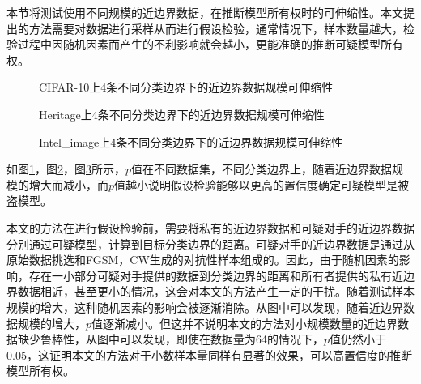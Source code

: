 本节将测试使用不同规模的近边界数据，在推断模型所有权时的可伸缩性。本文提出的方法需要对数据进行采样从而进行假设检验，通常情况下，样本数量越大，检验过程中因随机因素而产生的不利影响就会越小，更能准确的推断可疑模型所有权。

\begin{figure}[!htb]
	\centering
	\caption{CIFAR-10上4条不同分类边界下的近边界数据规模可伸缩性}
	\label{CIFAR-10上推断模型所有权的扩展性}
\end{figure}

\begin{figure}[!htb]
	\centering
	\caption{Heritage上4条不同分类边界下的近边界数据规模可伸缩性}
	\label{Heritage上推断模型所有权的扩展性}
\end{figure}

\begin{figure}[!htb]
	\centering
	\caption{Intel\_image上4条不同分类边界下的近边界数据规模可伸缩性}
	\label{Intel-image上推断模型所有权的扩展性}
\end{figure}

如图\ref{CIFAR-10上推断模型所有权的扩展性}，图\ref{Heritage上推断模型所有权的扩展性}，图\ref{Intel-image上推断模型所有权的扩展性}所示，$p$值在不同数据集，不同分类边界上，随着近边界数据规模的增大而减小，而$p$值越小说明假设检验能够以更高的置信度确定可疑模型是被盗模型。

本文的方法在进行假设检验前，需要将私有的近边界数据和可疑对手的近边界数据分别通过可疑模型，计算到目标分类边界的距离。可疑对手的近边界数据是通过从原始数据挑选和FGSM，CW生成的对抗性样本组成的。因此，由于随机因素的影响，存在一小部分可疑对手提供的数据到分类边界的距离和所有者提供的私有近边界数据相近，甚至更小的情况，这会对本文的方法产生一定的干扰。随着测试样本规模的增大，这种随机因素的影响会被逐渐消除。从图中可以发现，随着近边界数据规模的增大，$p$值逐渐减小。但这并不说明本文的方法对小规模数量的近边界数据缺少鲁棒性，从图中可以发现，即使在数据量为64的情况下，$p$值仍然小于0.05，这证明本文的方法对于小数样本量同样有显著的效果，可以高置信度的推断模型所有权。\\

